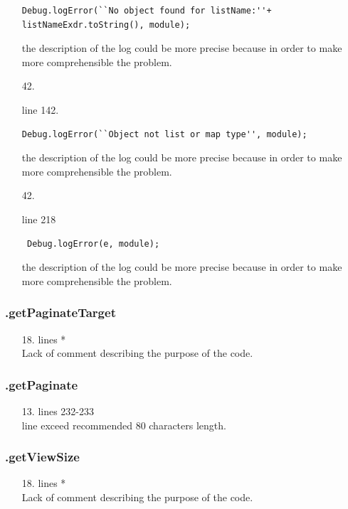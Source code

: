 \documentclass[english]{article}
\begin{document}
\begin{itemize}
{		\begin{lstlisting}
Debug.logError(``No object found for listName:''+ listNameExdr.toString(), module);
		\end{lstlisting}
		the description of the log could be more precise because in order to make more comprehensible the problem.}
	\item[42.]{line 142.		\begin{lstlisting} 
Debug.logError(``Object not list or map type'', module);
		\end{lstlisting}
		the description of the log could be more precise because in order to make more comprehensible the problem.}
	\item[42.]{line 218
		\begin{lstlisting} 
 Debug.logError(e, module);
		\end{lstlisting}
		the description of the log could be more precise because in order to make more comprehensible the problem.}
	
\end{itemize}

\subsubsection*{.getPaginateTarget}
\begin{itemize}
\item[18.]{lines  *\\
		Lack of comment describing the purpose of the code.}
\end{itemize}

\subsubsection*{.getPaginate}
\begin{itemize}
\item[13.]{lines 232-233 \\
		line exceed recommended 80 characters length.}
\end{itemize}
\subsubsection*{.getViewSize}
\begin{itemize}
\item[18.]{lines  *\\
		Lack of comment describing the purpose of the code.}
\end{itemize}
\end{document}
